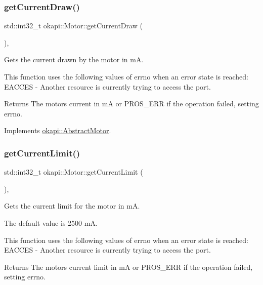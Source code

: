 \subsubsection{\texorpdfstring{getCurrentDraw()}{getCurrentDraw()}}
{\footnotesize\ttfamily std\+::int32\+\_\+t okapi\+::\+Motor\+::get\+Current\+Draw (\begin{DoxyParamCaption}{ }\end{DoxyParamCaption})\hspace{0.3cm}{\ttfamily [override]}, {\ttfamily [virtual]}}

Gets the current drawn by the motor in mA.

This function uses the following values of errno when an error state is reached\+: E\+A\+C\+C\+ES -\/ Another resource is currently trying to access the port.

\begin{DoxyReturn}{Returns}
The motor\textquotesingle{}s current in mA or P\+R\+O\+S\+\_\+\+E\+RR if the operation failed, setting errno. 
\end{DoxyReturn}


Implements \mbox{\hyperlink{classokapi_1_1AbstractMotor_a755ad2c78a4b36cc56eef1029a3aa217}{okapi\+::\+Abstract\+Motor}}.

\mbox{\label{classokapi_1_1Motor_ae309fb32ea479cec950dfaa65f3ffebd}} 
\subsubsection{\texorpdfstring{getCurrentLimit()}{getCurrentLimit()}}
{\footnotesize\ttfamily std\+::int32\+\_\+t okapi\+::\+Motor\+::get\+Current\+Limit (\begin{DoxyParamCaption}{ }\end{DoxyParamCaption})\hspace{0.3cm}{\ttfamily [override]}, {\ttfamily [virtual]}}

Gets the current limit for the motor in mA.

The default value is 2500 mA.

This function uses the following values of errno when an error state is reached\+: E\+A\+C\+C\+ES -\/ Another resource is currently trying to access the port.

\begin{DoxyReturn}{Returns}
The motor\textquotesingle{}s current limit in mA or P\+R\+O\+S\+\_\+\+E\+RR if the operation failed, setting errno. 
\end{DoxyReturn}


